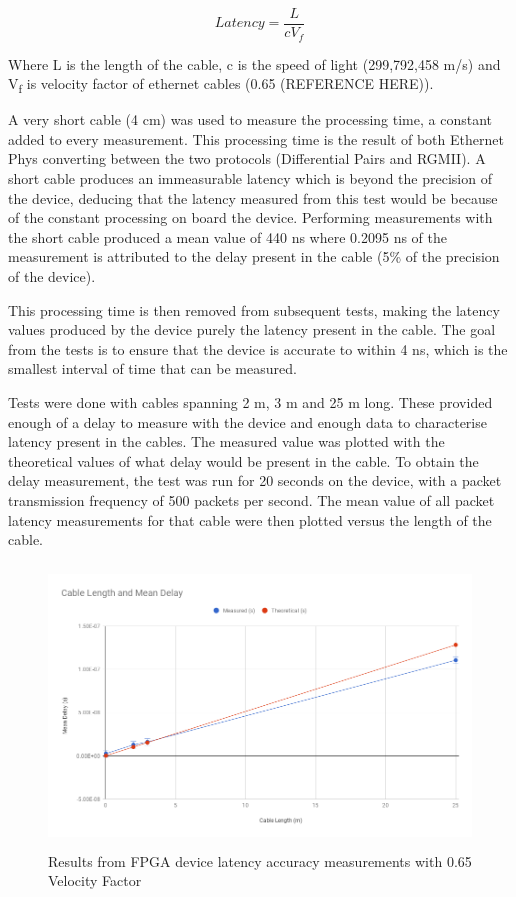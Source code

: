 \[ Latency = \frac{L}{cV_f} \] 

Where L is the length of the cable, c is the speed of light (299,792,458 m/s) and V\textsubscript{f} is velocity 
factor of ethernet cables (0.65 (REFERENCE HERE)).

A very short cable (4 cm) was used to measure the processing time, a constant added to every measurement. This 
processing time is the result of both Ethernet Phys converting between the two protocols (Differential Pairs and 
RGMII). A short cable produces an immeasurable latency which is beyond the precision of the device, deducing that 
the latency measured from this test would be because of the constant processing on board the device. Performing 
measurements with the short cable produced a mean value of 440 ns where 0.2095 ns of the measurement is attributed 
to the delay present in the cable (5\% of the precision of the device). 

This processing time is then removed from subsequent tests, making the latency values produced by the device purely 
the latency present in the cable. The goal from the tests is to ensure that the device is accurate to within 4 ns, 
which is the smallest interval of time that can be measured. 

Tests were done with cables spanning 2 m, 3 m and 25 m long. These provided enough of a delay to measure with the 
device and enough data to characterise latency present in the cables. The measured value was plotted with the 
theoretical values of what delay would be present in the cable. To obtain the delay measurement, the test was run 
for 20 seconds on the device, with a packet transmission frequency of 500 packets per second. The mean value of all 
packet latency measurements for that cable were then plotted versus the length of the cable.

\begin{figure}[H]
    \begin{center}
        \includegraphics[keepaspectratio,height=7.5cm]{Images/CableTesting}
        \caption{Results from FPGA device latency accuracy measurements with 0.65 Velocity Factor}
        \label{fig:cableTesting}
    \end{center}
\end{figure}


